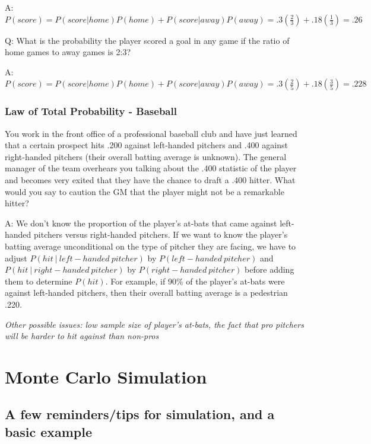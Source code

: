 \documentclass[
  11pt,
]{book}
\theoremstyle{definition}
\theoremstyle{definition}
\theoremstyle{definition}
\theoremstyle{definition}
\theoremstyle{remark}
\begin{document}
A: \(P(score) = P(score|home)P(home) + P(score|away)P(away) = .3(\frac{2}{3}) + .18(\frac{1}{3}) = .26\)

Q: What is the probability the player scored a goal in any game if the ratio of home games to away games is 2:3?

A: \(P(score) = P(score|home)P(home) + P(score|away)P(away) = .3(\frac{2}{5}) + .18(\frac{3}{5}) = .228\)

\hypertarget{law-of-total-probability---baseball}{%
\subsection{Law of Total Probability - Baseball}\label{law-of-total-probability---baseball}}

You work in the front office of a professional baseball club and have just learned that a certain prospect hits .200 against left-handed pitchers and .400 against right-handed pitchers (their overall batting average is unknown). The general manager of the team overhears you talking about the .400 statistic of the player and becomes very exited that they have the chance to draft a .400 hitter. What would you say to caution the GM that the player might not be a remarkable hitter?

A: We don't know the proportion of the player's at-bats that came against left-handed pitchers versus right-handed pitchers. If we want to know the player's batting average unconditional on the type of pitcher they are facing, we have to adjust \(P(hit\ |\ left-handed\ pitcher)\) by \(P(left-handed\ pitcher)\) and \(P(hit\ |\ right-handed\ pitcher)\) by \(P(right-handed\ pitcher)\) before adding them to determine \(P(hit)\). For example, if 90\% of the player's at-bats were against left-handed pitchers, then their overall batting average is a pedestrian .220.

\emph{Other possible issues: low sample size of player's at-bats, the fact that pro pitchers will be harder to hit against than non-pros}

\hypertarget{monte-carlo-simulation}{%
\chapter{Monte Carlo Simulation}\label{monte-carlo-simulation}}

\hypertarget{a-few-reminderstips-for-simulation-and-a-basic-example}{%
\section{A few reminders/tips for simulation, and a basic example}\label{a-few-reminderstips-for-simulation-and-a-basic-example}}
\end{document}
